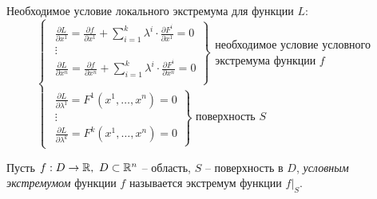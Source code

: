 \begin{task}
    Необходимое условие локального экстремума для функции $L:$
    \begin{equation}\label{eq:24}
      \left\{\begin{array}{l}
        \left.\begin{array}{l}
            \frac{\partial L}{\partial x^1} = \frac{\partial f}{\partial x^1} + \sum_{i = 1}^{k}\lambda^i\cdot\frac{\partial F^i}{\partial x^1} = 0 \\
            \vdots                                                                                                                      \\
            \frac{\partial L}{\partial x^n} = \frac{\partial f}{\partial x^n} + \sum_{i = 1}^{k}\lambda^i\cdot\frac{\partial F^i}{\partial x^n} = 0 \\
        \end{array}\right\}\begin{array}{l}
            \text{необходимое условие условного}\\
            \text{экстремума функции }f
        \end{array} \\
        \left.\begin{array}{l}
            \frac{\partial L}{\partial \lambda^1} = F^1(x^1,\ldots,x^n) = 0                                                                 \\
            \vdots                                                                                                                      \\
            \frac{\partial L}{\partial \lambda^k} = F^k(x^1,\ldots,x^n) = 0
        \end{array}\right\}\text{ поверхность }S
      \end{array}\right.
    \end{equation}
\end{task}

\begin{definition}
  Пусть $f:D\rightarrow\mathbb{R}, \ D \subset \mathbb{R}^n$ -- область, $S$ -- поверхность в $D$, \emph{условным экстремумом} функции $f$ называется экстремум функции $f\big|_S$.
\end{definition}